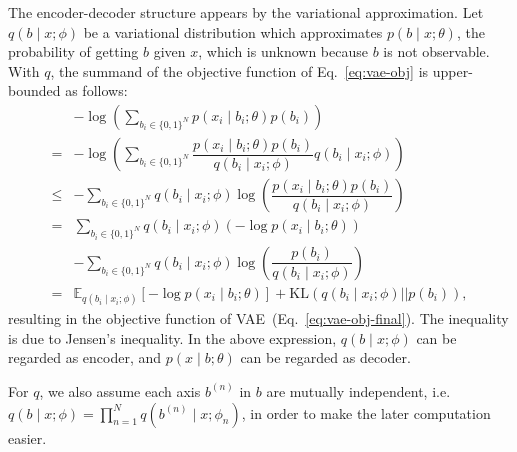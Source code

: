 \documentclass[10pt,letterpaper]{article}
\begin{document}
The encoder-decoder structure appears by the variational approximation.
Let $q(b \mid x;\phi)$ be a variational distribution which approximates $p(b \mid x;\theta)$, the probability of getting $b$ given $x$, which is unknown because $b$ is not observable.
With $q$, the summand of the objective function of Eq.~\eqref{eq:vae-obj} is upper-bounded as follows:
\begin{align}
\nonumber & - \log \left(\sum_{b_i\in\{0,1\}^N} p(x_i \mid b_i;\theta)p(b_i)\right) \\
\nonumber = & -  \log \left(\sum_{b_i\in\{0,1\}^N}\dfrac{p(x_i \mid b_i;\theta) p(b_i)}{q(b_i \mid x_i; \phi)}q(b_i \mid x_i; \phi)\right)\\
\nonumber\leq & - \sum_{b_i\in\{0,1\}^N} q(b_i \mid x_i; \phi)\log \left(\dfrac{p(x_i \mid b_i;\theta) p(b_i)}{q(b_i \mid x_i; \phi)}\right)\\
\nonumber =   &   \sum_{b_i\in\{0,1\}^N} q(b_i \mid x_i; \phi) \left(-\log p(x_i \mid b_i;\theta) \right)\\
\nonumber     & - \sum_{b_i\in\{0,1\}^N} q(b_i \mid x_i; \phi)\log \left(\dfrac{p(b_i)}{q(b_i \mid x_i; \phi)}\right) \\
\label{eq:vae-obj-final}= & \mathbb{E}_{q(b_i \mid x_i; \phi)}[-\log p(x_i \mid b_i;\theta)] + \mathrm{KL}(q(b_i \mid x_i; \phi) || p(b_i)),
\end{align}
resulting in the objective function of VAE~(Eq.~\eqref{eq:vae-obj-final}).
The inequality is due to Jensen's inequality.
In the above expression, $q(b \mid x;\phi)$ can be regarded as encoder, and $p(x\mid b;\theta)$ can be regarded as decoder.

For $q$, we also assume each axis $b^{(n)}$ in $b$ are mutually independent, i.e. $q(b \mid x;\phi)=\prod_{n=1}^N q(b^{(n)} \mid x;\phi_n)$,
in order to make the later computation easier.
\end{document}
